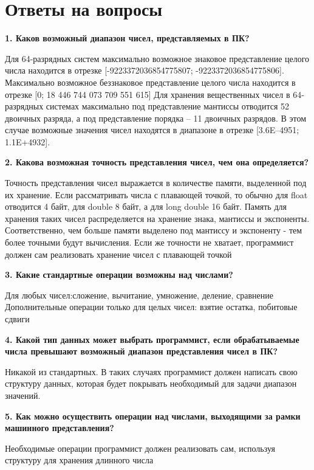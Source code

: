 \chapter{Ответы на вопросы}
\noindent\textbf{1. Каков возможный диапазон чисел, представляемых в ПК?}\par
Для 64-разрядных систем максимально возможное знаковое представление целого числа находится в отрезке [-9223372036854775807; -9223372036854775806]. Максимально возможное беззнаковое представление целого числа находится в отрезке [0; 18 446 744 073 709 551 615]
Для хранения вещественных чисел в 64-разрядных системах максимально под представление мантиссы отводится 52 двоичных разряда, а под представление порядка – 11 двоичных разрядов. В этом случае возможные значения чисел находятся в диапазоне в отрезке [3.6E–4951; 1.1E+4932].\newline

\noindent\textbf{2. Какова возможная точность представления чисел, чем она определяется?}\par
Точность представления чисел выражается в количестве памяти, выделенной под их хранение. Если рассматривать числа с плавающей точкой, то обычно для float отводится 4 байт, для double 8 байт, а для long double 16 байт. Память для хранения таких чисел распределяется на хранение знака, мантиссы и экспоненты. Соответственно, чем больше памяти выделено под мантиссу и экспоненту - тем более точными будут вычисления. Если же точности не хватает, программист должен сам реализовать хранение чисел с плавающей точкой\newline

\noindent\textbf{3. Какие стандартные операции возможны над числами?}\par
Для любых чисел:сложение, вычитание, умножение, деление, сравнение
Дополнительные операции только для целых чисел: взятие остатка, побитовые сдвиги\newline

\noindent\textbf{4. Какой тип данных может выбрать программист, если обрабатываемые
	числа превышают возможный диапазон представления чисел в ПК?}\par
Никакой из стандартных. В таких случаях программист должен написать свою структуру данных, которая будет покрывать необходимый для задачи диапазон значений.

\noindent\textbf{5. Как можно осуществить операции над числами, выходящими за
	рамки машинного представления?}\par
Необходимые операции программист должен реализовать сам, используя структуру для хранения длинного числа